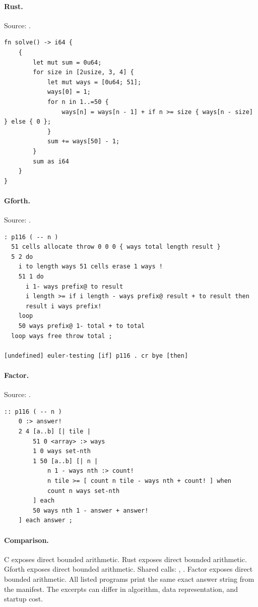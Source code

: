 \paragraph{Rust.} Source: .
\begin{lstlisting}
fn solve() -> i64 {
    {
        let mut sum = 0u64;
        for size in [2usize, 3, 4] {
            let mut ways = [0u64; 51];
            ways[0] = 1;
            for n in 1..=50 {
                ways[n] = ways[n - 1] + if n >= size { ways[n - size] } else { 0 };
            }
            sum += ways[50] - 1;
        }
        sum as i64
    }
}
\end{lstlisting}

\paragraph{Gforth.} Source: .
\begin{lstlisting}
: p116 ( -- n )
  51 cells allocate throw 0 0 0 { ways total length result }
  5 2 do
    i to length ways 51 cells erase 1 ways !
    51 1 do
      i 1- ways prefix@ to result
      i length >= if i length - ways prefix@ result + to result then
      result i ways prefix!
    loop
    50 ways prefix@ 1- total + to total
  loop ways free throw total ;

[undefined] euler-testing [if] p116 . cr bye [then]
\end{lstlisting}

\paragraph{Factor.} Source: .
\begin{lstlisting}
:: p116 ( -- n )
    0 :> answer!
    2 4 [a..b] [| tile |
        51 0 <array> :> ways
        1 0 ways set-nth
        1 50 [a..b] [| n |
            n 1 - ways nth :> count!
            n tile >= [ count n tile - ways nth + count! ] when
            count n ways set-nth
        ] each
        50 ways nth 1 - answer + answer!
    ] each answer ;
\end{lstlisting}

\paragraph{Comparison.}
C exposes direct bounded arithmetic. Rust exposes direct bounded arithmetic. Gforth exposes direct bounded arithmetic. Shared calls: \texttt{}, \texttt{}. Factor exposes direct bounded arithmetic.
All listed programs print the same exact answer string from the manifest. The excerpts can differ in algorithm, data representation, and startup cost.

